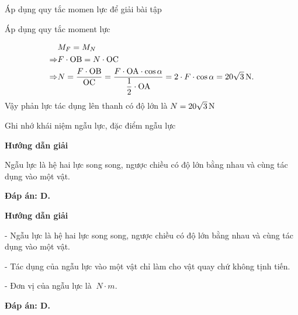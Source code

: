 \begin{dang}{Áp dụng quy tắc momen lực để giải bài tập}
{		Áp dụng quy tắc moment lực
		
		\begin{align*}
			&M_F=M_N\\
			\Rightarrow& F\cdot \si{OB} = N\cdot \si{OC}\\
			\Rightarrow& N  = \dfrac{F\cdot \si{OB}}{\si{OC}}
			=
			\dfrac{F\cdot \si{OA}\cdot \cos\alpha}{\dfrac{1}{2}\cdot \si{OA}}
			=2\cdot F\cdot \cos\alpha = \SI[parse-numbers=false]{20\sqrt{3}}{\newton}.
		\end{align*}
		Vậy phản lực tác dụng lên thanh có độ lớn là $N=\SI[parse-numbers=false]{20\sqrt{3}}{\newton}$
		
	}
	
\end{dang}
\begin{dang}{Ghi nhớ khái niệm ngẫu lực, đặc điểm ngẫu lực}
	{	\begin{center}
			\textbf{Hướng dẫn giải}
		\end{center}
		
		Ngẫu lực là hệ hai lực song song, ngược chiều có độ lớn bằng nhau và cùng tác dụng vào một vật.
		
		\textbf{Đáp án: D.}
	}
	{	\begin{center}
			\textbf{Hướng dẫn giải}
		\end{center}
		
		- Ngẫu lực là hệ hai lực song song, ngược chiều có độ lớn bằng nhau và cùng tác dụng vào một vật.
		
		- Tác dụng của ngẫu lực vào một vật chỉ làm cho vật quay chứ không tịnh tiến.
		
		- Đơn vị của ngẫu lực là $\SI{}{N\cdot m}$.
		
		\textbf{Đáp án: D.}
	}
\end{dang}
